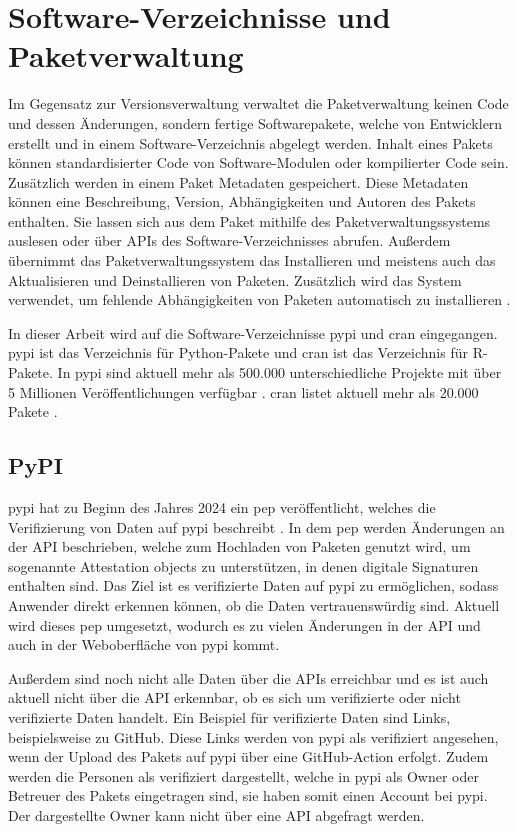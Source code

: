 \section{Software-Verzeichnisse und Paketverwaltung}
\label{sec:paketverwaltung}
Im Gegensatz zur Versionsverwaltung verwaltet die Paketverwaltung keinen Code und dessen Änderungen, sondern fertige Softwarepakete, welche von Entwicklern erstellt und in einem Software-Verzeichnis abgelegt werden.
Inhalt eines Pakets können standardisierter Code von Software-Modulen oder kompilierter Code sein.
Zusätzlich werden in einem Paket Metadaten gespeichert.
Diese Metadaten können eine Beschreibung, Version, Abhängigkeiten und Autoren des Pakets enthalten.
Sie lassen sich aus dem Paket mithilfe des Paketverwaltungssystems auslesen oder über APIs des Software-Verzeichnisses abrufen.
Außerdem übernimmt das Paketverwaltungssystem das Installieren und meistens auch das Aktualisieren und Deinstallieren von Paketen.
Zusätzlich wird das System verwendet, um fehlende Abhängigkeiten von Paketen automatisch zu installieren \autocite{spinellis_package_2012}.

In dieser Arbeit wird auf die Software-Verzeichnisse \gls{pypi} und \gls{cran} eingegangen.
\gls{pypi} ist das Verzeichnis für Python-Pakete und \gls{cran} ist das Verzeichnis für R-Pakete.
In \gls{pypi} sind aktuell mehr als 500.000 unterschiedliche Projekte mit über 5 Millionen Veröffentlichungen verfügbar \autocite{python_software_foundation_pypi_2024}.
\gls{cran} listet aktuell mehr als 20.000 Pakete \autocite{cran_team_comprehensive_2024}.

\subsection{PyPI}
\label{subsec:paketverwaltung_pypi}
\gls{pypi} hat zu Beginn des Jahres 2024 ein \gls{pep} veröffentlicht, welches die Verifizierung von Daten auf \gls{pypi} beschreibt \autocite{python_software_foundation_pep_2024}.
In dem \gls{pep} werden Änderungen an der API beschrieben, welche zum Hochladen von Paketen genutzt wird, um sogenannte \glqq Attestation objects\grqq{} zu unterstützen, in denen digitale Signaturen enthalten sind.
Das Ziel ist es verifizierte Daten auf \gls{pypi} zu ermöglichen, sodass Anwender direkt erkennen können, ob die Daten vertrauenswürdig sind.
Aktuell wird dieses \gls{pep} umgesetzt, wodurch es zu vielen Änderungen in der API und auch in der Weboberfläche von \gls{pypi} kommt.

Außerdem sind noch nicht alle Daten über die APIs erreichbar und es ist auch aktuell nicht über die API erkennbar, ob es sich um verifizierte oder nicht verifizierte Daten handelt.
Ein Beispiel für verifizierte Daten sind Links, beispielsweise zu GitHub.
Diese Links werden von \gls{pypi} als verifiziert angesehen, wenn der Upload des Pakets auf \gls{pypi} über eine GitHub-Action erfolgt.
Zudem werden die Personen als verifiziert dargestellt, welche in \gls{pypi} als Owner oder Betreuer des Pakets eingetragen sind, sie haben somit einen Account bei \gls{pypi}.
Der dargestellte Owner kann nicht über eine API abgefragt werden.

